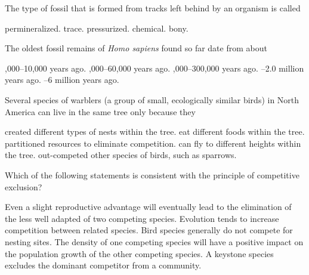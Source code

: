 \question
The type of fossil that is formed from tracks left behind by an organism is called

\begin{choices}
	\choice permineralized. %
	\correctchoice trace. %
	\choice pressurized. %
	\choice chemical. %
	\choice bony. %
\end{choices}

\question
The oldest fossil remains of \textit{Homo sapiens} found so far date from about  

\begin{choices}
	,000–10,000 years ago. %
	,000–60,000 years ago. %
	,000–300,000 years ago. %
	–2.0 million years ago. %
	–6 million years ago. %
\end{choices}



\question
Several species of warblers (a group of small, ecologically similar birds) in North America can live in the same tree only because they

\begin{choices}
	\choice created different types of nests within the tree.%
	\choice eat different foods within the tree.%
	\correctchoice partitioned resources to eliminate competition.%
	\choice can fly to different heights within the tree.%
	\choice out-competed other species of birds, such as sparrows.%
\end{choices}


\question
Which of the following statements is consistent with the principle of competitive exclusion?  

\begin{choices}
	\correctchoice Even a slight reproductive advantage will eventually lead to the elimination of the less well adapted of two competing species. %
	\choice Evolution tends to increase competition between related species.   %
	\choice Bird species generally do not compete for nesting sites.  %
	\choice The density of one competing species will have a positive impact on the population growth of the other competing species. %
	\choice A keystone species excludes the dominant competitor from a community.   %
\end{choices}

